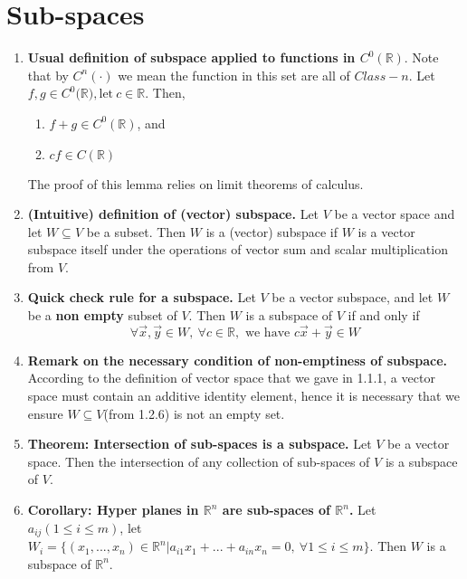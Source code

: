 \documentclass[oneside, 12pt]{book}
\newcommand{\settag}[1]{\renewcommand{\theenumi}{#1}}
\newcommand{\R}{\mathbb{R}}
\begin{document}
\section{Sub-spaces}
    \begin{enumerate}
        \settag{1.2.4}
        \item \textbf{Usual definition of subspace applied to functions in $C^0(\mathbb{R})$}. Note that by $C^n(\cdot)$ we mean the function in this set are all of $Class-n$. Let $f,g \in C^0(\mathbb{R)}, \text{let} ~c\in \mathbb{R}$. Then, 
        \begin{enumerate}
            \item $f+g\in C^0(\R)$, and
            \item $cf \in C(\R)$
        \end{enumerate}
        The proof of this lemma relies on limit theorems of calculus.
        
        \settag{1.2.6}
        \item \textbf{(Intuitive) definition of (vector) subspace.} Let $V$ be a vector space and let $W\subseteq V$ be a subset. Then $W$ is a (vector) subspace if $W$ is a vector subspace itself under the operations of vector sum and scalar multiplication from $V$.
        
        \settag{1.2.8}
        \item \textbf{Quick check rule for a subspace.} Let $V$ be a vector subspace, and let $W$ be a \textbf{non empty} subset of $V$. Then $W$ is a subspace of $V$ if and only if 
        \begin{equation*}
            \forall \vec{x}, \vec{y}\in W,~\forall c\in \R, \text{ we have } c\vec{x}+\vec{y}\in W
        \end{equation*}
        \settag{1.2.9}
        \item \textbf{Remark on the necessary condition of non-emptiness of subspace.} According to the definition of vector space that we gave in 1.1.1, a vector space must contain an additive identity element, hence it is necessary that we ensure $W\subseteq V$(from 1.2.6) is not an empty set.
        
        \settag{1.2.13}
        \item \textbf{Theorem: Intersection of sub-spaces is a subspace.} Let $V$ be a vector space. Then the intersection of any collection of sub-spaces of $V$ is a subspace of $V$.
        
        \settag{1.2.14}
        \item \textbf{Corollary: Hyper planes in $\R^n$ are sub-spaces of $\R^n$.} Let $a_{ij}(1\leq i\leq m)$, let $W_i = \{(x_1, ..., x_n)\in \R^n|a_{i1}x_1 + ... + a_{in}x_n = 0,~\forall 1 \leq i \leq m\}$. Then $W$ is a subspace of $\R^n$.
        
    \end{enumerate}
    
\end{document}
